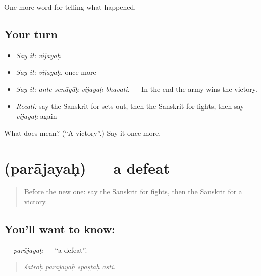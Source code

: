 \begin{grammarlens}[title={What you've built}]
One more word for telling what happened.
\end{grammarlens}

\subsection*{Your turn}
\begin{itemize}
\raggedright
  \item \emph{Say it:} \emph{vijayaḥ}
  \item \emph{Say it:} \emph{vijayaḥ}, once more
  \item \emph{Say it:} \emph{ante senāyāḥ vijayaḥ bhavati.} — In the end the army wins the victory.
  \item \emph{Recall:} say the Sanskrit for sets out, then the Sanskrit for fights, then say \emph{vijayaḥ} again
\end{itemize}

\begin{tcolorbox}[breakable,colback=teal!4,colframe=teal!35!black,title={Before you move on}]
What does  mean? (\textquotedblleft{}A victory\textquotedblright{}.) Say it once more.
\end{tcolorbox}
\section[\texorpdfstring{\sk{पराजयः} (parājayaḥ)}{पराजयः (parājayaḥ)}]{ (parājayaḥ) — a defeat}

\label{lesson:SA-C319-parajayah}



\begin{quote}
Before the new one: say the Sanskrit for fights, then the Sanskrit for a victory.
\end{quote}

\subsection*{You'll want to know: }
\textbf{} — \emph{parājayaḥ} — \textquotedblleft{}a defeat\textquotedblright{}.

\begin{quote}
   
\end{quote}

\begin{quote}
\emph{śatroḥ parājayaḥ spaṣṭaḥ asti.}
\end{quote}

